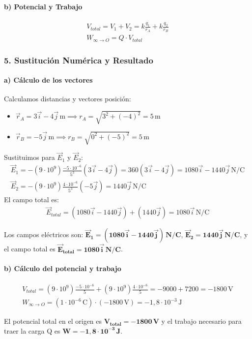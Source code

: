\paragraph*{b) Potencial y Trabajo}
\begin{gather}
    V_{total} = V_1 + V_2 = k \frac{q_1}{r_A} + k \frac{q_2}{r_B} \\
    W_{\infty \to O} = Q \cdot V_{total}
\end{gather}

\subsubsection*{5. Sustitución Numérica y Resultado}
\paragraph*{a) Cálculo de los vectores}
Calculamos distancias y vectores posición:
\begin{itemize}
    \item $\vec{r}_A = 3\vec{i} - 4\vec{j}\,\text{m} \implies r_A = \sqrt{3^2 + (-4)^2} = 5\,\text{m}$
    \item $\vec{r}_B = -5\vec{j}\,\text{m} \implies r_B = \sqrt{0^2 + (-5)^2} = 5\,\text{m}$
\end{itemize}
Sustituimos para $\vec{E}_1$ y $\vec{E}_2$:
\begin{gather}
    \vec{E}_1 = -(9\cdot10^9) \frac{-5\cdot10^{-6}}{5^3} (3\vec{i} - 4\vec{j}) = 360 (3\vec{i} - 4\vec{j}) = 1080\vec{i} - 1440\vec{j} \, \text{N/C} \\
    \vec{E}_2 = -(9\cdot10^9) \frac{4\cdot10^{-6}}{5^3} (-5\vec{j}) = 1440\vec{j} \, \text{N/C}
\end{gather}
El campo total es:
\begin{gather}
    \vec{E}_{total} = (1080\vec{i} - 1440\vec{j}) + (1440\vec{j}) = 1080\vec{i} \, \text{N/C}
\end{gather}
\begin{cajaresultado}
    Los campos eléctricos son:
    $\boldsymbol{\vec{E}_1 = (1080\vec{i} - 1440\vec{j}) \, \textbf{N/C}}$,
    $\boldsymbol{\vec{E}_2 = 1440\vec{j} \, \textbf{N/C}}$,
    y el campo total es $\boldsymbol{\vec{E}_{total} = 1080\vec{i} \, \textbf{N/C}}$.
\end{cajaresultado}
\paragraph*{b) Cálculo del potencial y trabajo}
\begin{gather}
    V_{total} = (9\cdot10^9) \frac{-5\cdot10^{-6}}{5} + (9\cdot10^9) \frac{4\cdot10^{-6}}{5} = -9000 + 7200 = -1800 \, \text{V} \\
    W_{\infty \to O} = (1\cdot10^{-6}\,\text{C}) \cdot (-1800\,\text{V}) = -1,8 \cdot 10^{-3} \, \text{J}
\end{gather}
\begin{cajaresultado}
    El potencial total en el origen es $\boldsymbol{V_{total} = -1800 \, \textbf{V}}$ y el trabajo necesario para traer la carga Q es $\boldsymbol{W = -1,8 \cdot 10^{-3} \, \textbf{J}}$.
\end{cajaresultado}

